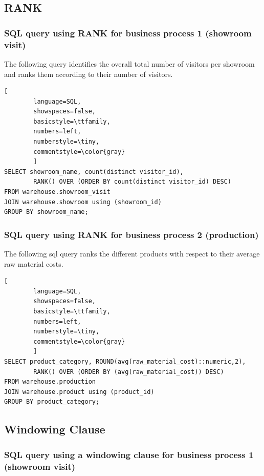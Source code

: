 \documentclass[letterpaper,12pt]{article}
\begin{document}
\subsection{RANK}

\subsubsection{SQL query using RANK for business process 1 (showroom visit)}

The following query identifies the overall total number of visitors per showroom and ranks them according to their number of visitors.

\begin{lstlisting}[
        language=SQL,
        showspaces=false,
        basicstyle=\ttfamily,
        numbers=left,
        numberstyle=\tiny,
        commentstyle=\color{gray}
        ]
SELECT showroom_name, count(distinct visitor_id), 
        RANK() OVER (ORDER BY count(distinct visitor_id) DESC)
FROM warehouse.showroom_visit
JOIN warehouse.showroom using (showroom_id)
GROUP BY showroom_name;
\end{lstlisting}

\subsubsection{SQL query using RANK for business process 2 (production)}

The following sql query ranks the different products with respect to their average raw material costs.

\begin{lstlisting}[
        language=SQL,
        showspaces=false,
        basicstyle=\ttfamily,
        numbers=left,
        numberstyle=\tiny,
        commentstyle=\color{gray}
        ]
SELECT product_category, ROUND(avg(raw_material_cost)::numeric,2),
        RANK() OVER (ORDER BY (avg(raw_material_cost)) DESC)
FROM warehouse.production
JOIN warehouse.product using (product_id)
GROUP BY product_category;
\end{lstlisting}
                
\subsection{Windowing Clause}

\subsubsection{SQL query using a windowing clause for business process 1 (showroom visit)}
\end{document}
